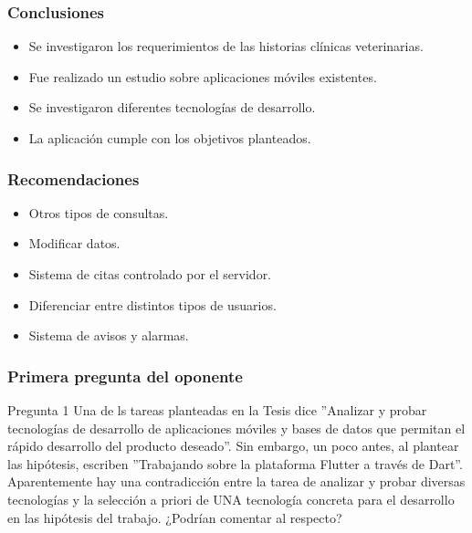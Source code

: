 \documentclass[14pt]{beamer}
\begin{document}
\begin{frame}
\frametitle{Conclusiones}
\begin{itemize}
\item[\checkmark] Se investigaron los requerimientos de las historias clínicas veterinarias.
\item[\checkmark] Fue realizado un estudio sobre aplicaciones móviles existentes.
\item[\checkmark] Se investigaron diferentes tecnologías de desarrollo.
\item[\checkmark] La aplicación cumple con los objetivos planteados.
\end{itemize}
\end{frame}



\begin{frame}
\frametitle{Recomendaciones}

\begin{itemize}
\item Otros tipos de consultas.
\item Modificar datos.
\item Sistema de citas controlado por el servidor.
\item Diferenciar entre distintos tipos de usuarios.
\item Sistema de avisos y alarmas.
\end{itemize}

\end{frame}





\begin{frame}
\maketitle
\end{frame}




\begin{frame}
\frametitle{Primera pregunta del oponente}
\begin{block}{Pregunta 1}
 Una de ls tareas planteadas en la Tesis dice ''Analizar y probar tecnologías de desarrollo de aplicaciones móviles y bases de datos que permitan el rápido desarrollo del producto deseado''. Sin embargo, un poco antes, al plantear las hipótesis, escriben ''Trabajando sobre la plataforma Flutter a través de Dart''. Aparentemente hay una contradicción entre la tarea de analizar y probar diversas tecnologías y la selección a priori de UNA tecnología concreta para el desarrollo en las hipótesis del trabajo. ¿Podrían comentar al respecto?
\end{block}
\end{frame}
\end{document}
